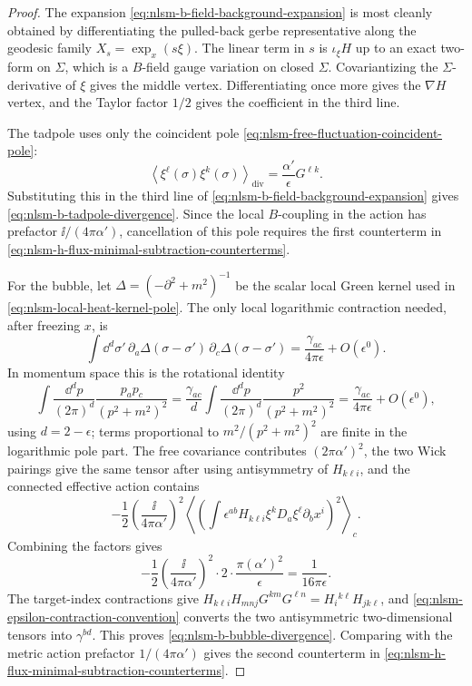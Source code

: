 \begin{proof}
The expansion \eqref{eq:nlsm-b-field-background-expansion} is most cleanly
obtained by differentiating the pulled-back gerbe representative along the
geodesic family \(X_s=\exp_x(s\xi)\).  The linear term in \(s\) is
\(\iota_\xi H\) up to an exact two-form on \(\Sigma\), which is a
\(B\)-field gauge variation on closed \(\Sigma\).  Covariantizing the
\(\Sigma\)-derivative of \(\xi\) gives the middle vertex.  Differentiating
once more gives the \(\nabla H\) vertex, and the Taylor factor \(1/2\) gives
the coefficient in the third line.

The tadpole uses only the coincident pole
\eqref{eq:nlsm-free-fluctuation-coincident-pole}:
\[
  \left\langle
    \xi^\ell(\sigma)\xi^k(\sigma)
  \right\rangle_{\mathrm{div}}
  =
  \frac{\alpha'}{\epsilon}G^{\ell k}.
\]
Substituting this in the third line of
\eqref{eq:nlsm-b-field-background-expansion} gives
\eqref{eq:nlsm-b-tadpole-divergence}.  Since the local \(B\)-coupling in the
action has prefactor \(\ii/(4\pi\alpha')\), cancellation of this pole requires
the first counterterm in
\eqref{eq:nlsm-h-flux-minimal-subtraction-counterterms}.

For the bubble, let \(\Delta=(-\partial^2+m^2)^{-1}\) be the scalar local
Green kernel used in \eqref{eq:nlsm-local-heat-kernel-pole}.  The only local
logarithmic contraction needed, after freezing \(x\), is
\begin{equation}
  \int\dd^d\sigma'\,
  \partial_a\Delta(\sigma-\sigma')\,
  \partial_c\Delta(\sigma-\sigma')
  =
  \frac{\gamma_{ac}}{4\pi\epsilon}+O(\epsilon^0).
  \label{eq:nlsm-derivative-propagator-pole}
\end{equation}
In momentum space this is the rotational identity
\[
  \int\frac{\dd^dp}{(2\pi)^d}
  \frac{p_ap_c}{(p^2+m^2)^2}
  =
  \frac{\gamma_{ac}}{d}
  \int\frac{\dd^dp}{(2\pi)^d}
  \frac{p^2}{(p^2+m^2)^2}
  =
  \frac{\gamma_{ac}}{4\pi\epsilon}+O(\epsilon^0),
\]
using \(d=2-\epsilon\); terms proportional to \(m^2/(p^2+m^2)^2\) are finite
in the logarithmic pole part.  The free covariance contributes
\((2\pi\alpha')^2\), the two Wick pairings give the same tensor after using
antisymmetry of \(H_{k\ell i}\), and the connected effective action contains
\[
  -\frac12\left(\frac{\ii}{4\pi\alpha'}\right)^2
  \left\langle
    \left(
      \int\epsilon^{ab}H_{k\ell i}\xi^kD_a\xi^\ell\partial_bx^i
    \right)^2
  \right\rangle_{\!c}.
\]
Combining the factors gives
\[
  -\frac12\left(\frac{\ii}{4\pi\alpha'}\right)^2
  \cdot 2\cdot
  \frac{\pi(\alpha')^2}{\epsilon}
  =
  \frac1{16\pi\epsilon}.
\]
The target-index contractions give
\(H_{k\ell i}H_{mn j}G^{km}G^{\ell n}=H_i{}^{k\ell}H_{jk\ell}\), and
\eqref{eq:nlsm-epsilon-contraction-convention} converts the two
antisymmetric two-dimensional tensors into \(\gamma^{bd}\).  This proves
\eqref{eq:nlsm-b-bubble-divergence}.  Comparing with the metric action
prefactor \(1/(4\pi\alpha')\) gives the second counterterm in
\eqref{eq:nlsm-h-flux-minimal-subtraction-counterterms}.


\end{proof}
